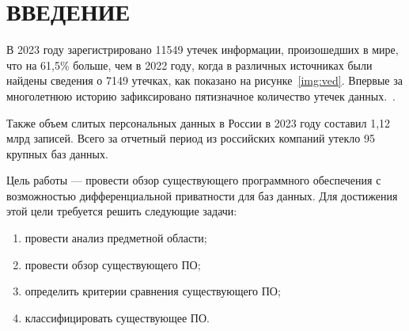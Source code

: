 \chapter*{ВВЕДЕНИЕ}
В 2023 году зарегистрировано 11549 утечек информации, произошедших в мире, что
на 61,5\% больше, чем в 2022 году, когда в различных источниках были найдены
сведения о 7149 утечках, как показано на рисунке~\ref{img:ved}. Впервые за многолетнюю историю зафиксировано пятизначное количество утечек данных.~\cite{utechkimain}.

Также объем слитых персональных данных в России в 2023 году составил 1,12 млрд записей. Всего за отчетный период из российских компаний утекло 95 крупных баз данных.~\cite{utechkimain}
 
 

Цель работы --- провести обзор существующего программного обеспечения с возможностью
дифференциальной приватности для баз данных.
Для достижения этой цели требуется решить следующие задачи:
\begin{enumerate}[label*=---]
	\item провести анализ предметной области; 
	\item провести обзор существующего ПО;
	\item определить критерии сравнения существующего ПО;
	\item классифицировать существующее ПО.
\end{enumerate}